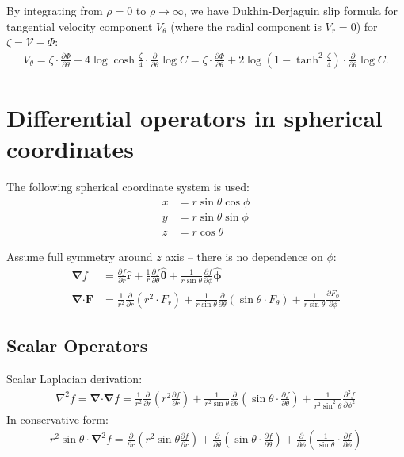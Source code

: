\documentclass[MSc,beforeExam]{iitcsthesis}
\newcommand{\deriv}[2]{\frac{\partial #1}{\partial #2}}
\newcommand{\pars}[1]{\left(#1\right)}
\newcommand\Laplacian{\nabla^2}
\newcommand\bnabla{\boldsymbol{\nabla}}
\newcommand\bLaplacian{\boldsymbol{\nabla}^2}
\newcommand\cV{\mathscr{V}}
\begin{document}
By integrating from $\rho = 0$ to $\rho \rightarrow \infty$, 
we have Dukhin-Derjaguin slip formula for tangential velocity component $V_\theta$ 
(where the radial component is $V_r = 0$) for $\zeta = \cV - \varPhi$:
\begin{align} 
V_\theta = \zeta \cdot \deriv{\varPhi}{\theta} -
      4\log\cosh \frac{\zeta}{4} \cdot \deriv{}{\theta} \log C 
= \zeta \cdot \deriv{\varPhi}{\theta} + 
      2\log\pars{1 - \tanh^2 \frac{\zeta}{4}} \cdot \deriv{}{\theta} \log C .
\end{align}

\chapter{Differential operators in spherical coordinates} \label{append:spherical}

The following spherical coordinate system is used:
\begin{align}
\nonumber
x &= r \sin \theta \cos \phi \\
y &= r \sin \theta \sin \phi \\
\nonumber
z &= r \cos \theta
\end{align}

Assume full symmetry around $z$ axis -- there is no dependence on $\phi$:
\begin{align}
\bnabla f &= \frac{\partial f}{\partial r} \mathbf{\hat{r}} +
\frac{1}{r} \frac{\partial f}{\partial \theta} \mathbf{\hat{\theta}} +
\frac{1}{r \sin\theta} \frac{\partial f}{\partial \phi} \mathbf{\hat{\phi}}
\\
\bnabla \mathbf{\cdot} \mathbf{F} &= 
\frac{1}{r^2}\frac{\partial}{\partial r} \left( r^2 \cdot F_r\right)
  + \frac{1}{r \sin\theta} \frac{\partial}{\partial \theta} \left( \sin\theta \cdot F_\theta\right)
  + \frac{1}{r \sin\theta} \frac{\partial F_\phi}{\partial \phi}
\end{align}

\section{Scalar Operators}
Scalar Laplacian derivation:
\begin{align}
\Laplacian f = \bnabla \mathbf{\cdot} \bnabla f = \frac{1}{r^2}\frac{\partial}{\partial r}
\left( r^2 \frac{\partial f}{\partial r} \right) +
\frac{1}{r^2 \sin\theta} \frac{\partial}{\partial \theta} \left( \sin\theta \cdot \frac{\partial f}{\partial \theta}\right)
+ \frac{1}{r^2 \sin^2\theta} \frac{\partial^2 f}{\partial \phi^2}
\end{align}
In conservative form:
\begin{align}
r^2 \sin\theta \cdot \bLaplacian f = \frac{\partial}{\partial r} \left( r^2 \sin \theta \frac{\partial f}{\partial r} \right) +
\frac{\partial}{\partial \theta} \left( \sin\theta \cdot \frac{\partial f}{\partial \theta}\right) +
\frac{\partial}{\partial \phi} \left( \frac{1}{\sin\theta} \cdot \frac{\partial f}{\partial \phi}\right)
\end{align}
\end{document}
